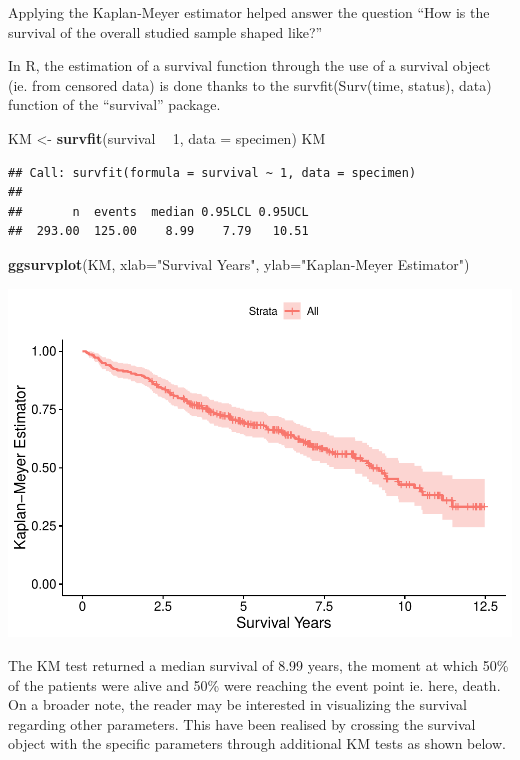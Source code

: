 \documentclass[]{article}
\newenvironment{Shaded}{\begin{snugshade}}{\end{snugshade}}
\newcommand{\KeywordTok}[1]{\textcolor[rgb]{0.13,0.29,0.53}{\textbf{#1}}}
\newcommand{\DataTypeTok}[1]{\textcolor[rgb]{0.13,0.29,0.53}{#1}}
\newcommand{\DecValTok}[1]{\textcolor[rgb]{0.00,0.00,0.81}{#1}}
\newcommand{\StringTok}[1]{\textcolor[rgb]{0.31,0.60,0.02}{#1}}
\newcommand{\OperatorTok}[1]{\textcolor[rgb]{0.81,0.36,0.00}{\textbf{#1}}}
\newcommand{\NormalTok}[1]{#1}
\begin{document}
Applying the Kaplan-Meyer estimator helped answer the question ``How is
the survival of the overall studied sample shaped like?''

In R, the estimation of a survival function through the use of a
survival object (ie. from censored data) is done thanks to the
survfit(Surv(time, status), data) function of the ``survival'' package.

\begin{Shaded}
\begin{Highlighting}[]
\NormalTok{KM <-}\StringTok{ }\KeywordTok{survfit}\NormalTok{(survival }\OperatorTok{~}\StringTok{ }\DecValTok{1}\NormalTok{, }\DataTypeTok{data =}\NormalTok{ specimen)}
\NormalTok{KM}
\end{Highlighting}
\end{Shaded}

\begin{verbatim}
## Call: survfit(formula = survival ~ 1, data = specimen)
## 
##       n  events  median 0.95LCL 0.95UCL 
##  293.00  125.00    8.99    7.79   10.51
\end{verbatim}

\begin{Shaded}
\begin{Highlighting}[]
\KeywordTok{ggsurvplot}\NormalTok{(KM, }\DataTypeTok{xlab=}\StringTok{"Survival Years"}\NormalTok{, }\DataTypeTok{ylab=}\StringTok{"Kaplan-Meyer Estimator"}\NormalTok{)}
\end{Highlighting}
\end{Shaded}

\includegraphics{report_files/figure-latex/unnamed-chunk-9-1.pdf}

The KM test returned a median survival of 8.99 years, the moment at
which 50\% of the patients were alive and 50\% were reaching the event
point ie. here, death. On a broader note, the reader may be interested
in visualizing the survival regarding other parameters. This have been
realised by crossing the survival object with the specific parameters
through additional KM tests as shown below.
\end{document}

